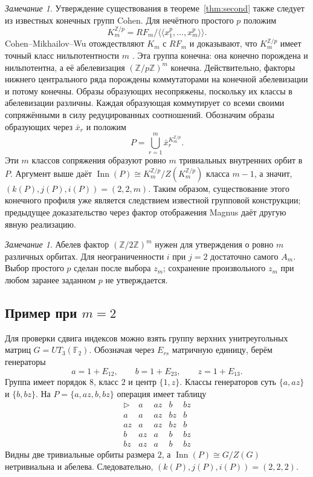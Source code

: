 \documentclass[11pt,a4paper]{article}
\theoremstyle{definition}
\theoremstyle{remark}
\newtheorem{remark}[theorem]{Замечание}
\newcommand{\Inn}{\operatorname{Inn}}
\newcommand{\Z}{\mathbb Z}
\newcommand{\F}{\mathbb F}
\newcommand{\conj}{\triangleright}
\begin{document}
\begin{remark}\label{rmk:cohen}
Утверждение существования в теореме~\ref{thm:second} также следует
из известных конечных групп Cohen. Для нечётного простого \(p\) положим
\[
 K_m^{\Z/p}=RF_m/\langle\!\langle x_1^p,\ldots,x_m^p\rangle\!\rangle.
\]
Cohen--Mikhailov--Wu отождествляют \(K_m\) с \(RF_m\) и доказывают,
что \(K_m^{\Z/p}\) имеет точный класс нильпотентности \(m\)
\cite[разделы~1--2]{CMW}. Эта группа конечна: она конечно порождена
и нильпотентна, а её абелевизация \((\Z/p\Z)^m\) конечна.
Действительно, факторы нижнего центрального ряда порождены коммутаторами
на конечной абелевизации и потому конечны. Образы образующих
несопряжены, поскольку их классы в абелевизации различны.
Каждая образующая коммутирует со всеми своими сопряжёнными в силу
редуцированных соотношений. Обозначим образы образующих через \(\bar x_r\) и положим
\[
 P=\bigcup_{r=1}^{m}\bar x_r^{K_m^{\Z/p}}.
\]
Эти \(m\) классов сопряжения образуют ровно \(m\) тривиальных
внутренних орбит в \(P\). Аргумент выше даёт
\(\Inn(P)\cong K_m^{\Z/p}/Z(K_m^{\Z/p})\) класса \(m-1\),
а значит, \((k(P),j(P),i(P))=(2,2,m)\).
Таким образом, существование этого конечного профиля уже является
следствием известной групповой конструкции; предыдущее доказательство
через фактор отображения Magnus даёт другую явную реализацию.
\end{remark}

\begin{remark}
Абелев фактор \((\Z/2\Z)^m\) нужен для утверждения о ровно
\(m\) различных орбитах. Для неограниченности \(i\) при \(j=2\)
достаточно самого \(A_m\).
Выбор простого \(p\) сделан после выбора \(z_m\);
сохранение произвольного \(z_m\) при любом заранее заданном \(p\)
не утверждается.
\end{remark}

\subsection{\texorpdfstring{Пример при \(m=2\)}{Пример при m=2}}

Для проверки сдвига индексов можно взять
группу верхних унитреугольных матриц \(G=UT_3(\F_2)\).
Обозначая через \(E_{rs}\) матричную единицу, берём генераторы
\[
 a=1+E_{12},\qquad b=1+E_{23},\qquad z=1+E_{13}.
\]
Группа имеет порядок \(8\), класс \(2\) и центр \(\{1,z\}\).
Классы генераторов суть \(\{a,az\}\) и \(\{b,bz\}\).
На \(P=\{a,az,b,bz\}\) операция имеет таблицу
\[
 \begin{array}{c|cccc}
 \conj&a&az&b&bz\\ \hline
 a&a&az&bz&b\\
 az&a&az&bz&b\\
 b&az&a&b&bz\\
 bz&az&a&b&bz
 \end{array}
\]
Видны две тривиальные орбиты размера \(2\), а
\(\Inn(P)\cong G/Z(G)\) нетривиальна и абелева.
Следовательно, \((k(P),j(P),i(P))=(2,2,2)\).
\end{document}
